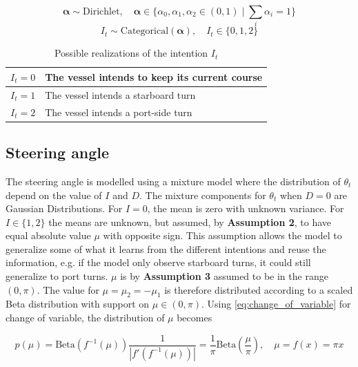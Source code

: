 \begin{equation}
    \boldsymbol{\alpha} \sim \text{Dirichlet}, \quad \boldsymbol{\alpha} \in \{\alpha_0, \alpha_1, \alpha_2 \in (0, 1) \; | \; \sum_i \alpha_i = 1 \}
\end{equation}
\begin{equation}
    I_t \sim \text{Categorical}(\boldsymbol{\alpha}), \quad I_t \in \{0, 1, 2\}
\end{equation}

\begin{table}[h]
\centering
\begin{tabular}{|l|l|}
\hline
$I_t=0$ & The vessel intends to keep its current course \\ \hline
$I_t=1$ & The vessel intends a starboard turn           \\ \hline
$I_t=2$ & The vessel intends a port-side turn            \\ \hline
\end{tabular}
\caption{Possible realizations of the intention $I_t$}
\label{tbl:intentions}
\end{table}

\subsection{Steering angle}
The steering angle is modelled using a mixture model where the distribution of $\theta_t$ depend on the value of $I$ and $D$.
The mixture components for $\theta_t$ when $D=0$ are Gaussian Distributions. For $I=0$, the mean is zero with unknown variance. For $I \in \{1, 2\}$ the means are unknown, but assumed, by \textbf{Assumption 2}, to have equal absolute value $\mu$ with opposite sign. This assumption allows the model to generalize some of what it learns from the different intentions and reuse the information, e.g. if the model only observe starboard turns, it could still generalize to port turns.  $\mu$ is by \textbf{Assumption 3} assumed to be in the range $(0, \pi)$. The value for $\mu = \mu_2 = -\mu_1$ is therefore distributed according to a scaled Beta distribution with support on $\mu \in (0, \pi)$.  Using \cref{eq:change_of_variable} for change of variable, the distribution of $\mu$ becomes 

\begin{equation}\label{eq:prior_mu}
    p(\mu) = \text{Beta}(f^{-1}(\mu)) \frac{1}{|f'(f^{-1}(\mu))|}  = \frac{1}{\pi} \text{Beta}(\frac{\mu}{\pi}), \quad \mu = f(x) = \pi x
\end{equation}

